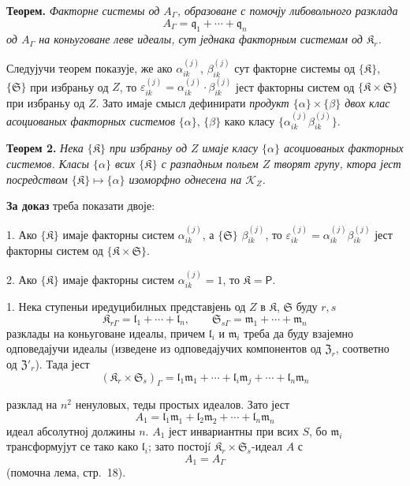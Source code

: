 \documentclass[11pt]{article}
\begin{document}
\textbf{Теорем.} \emph{Факторне системы од \(A_\Gamma\), образоване с помочју либовольного разклада}
\[
A_\Gamma=\mathfrak q_1+\cdots+\mathfrak q_n
\]
\emph{од \(A_\Gamma\) на коньуговане леве идеалы, сут једнака факторным системам од \(\mathfrak K_r\).}

Следујучи теорем показује, же ако \(\alpha_{ik}^{(j)}\), \(\beta_{ik}^{(j)}\) сут факторне системы од \(\{\mathfrak K\}\), \(\{\mathfrak S\}\) при избраньу од \(Z\), то \(\varepsilon_{ik}^{(j)}=\alpha_{ik}^{(j)}\cdot\beta_{ik}^{(j)}\) јест факторны систем од \(\{\mathfrak K\times\mathfrak S\}\) при избраньу од \(Z\). Зато имаје смысл дефинирати \emph{продукт \(\{\alpha\}\times\{\beta\}\) двох клас асоциованых факторных системов} \(\{\alpha\}\), \(\{\beta\}\) како класу \(\{\alpha_{ik}^{(j)}\beta_{ik}^{(j)}\}\).

\textbf{Теорем 2.} \emph{Нека \(\{\mathfrak K\}\) при избраньу од \(Z\) имаје класу \(\{\alpha\}\) асоциованых факторных системов. Класы \(\{\alpha\}\) всих \(\{\mathfrak K\}\) с разпадным польем \(Z\) творят групу, ктора јест посредством \(\{\mathfrak K\}\mapsto\{\alpha\}\) изоморфно однесена на \(\mathscr K_Z\).}

\textbf{За доказ} треба показати двоје:

1. Ако \(\{\mathfrak K\}\) имаје факторны систем \(\alpha_{ik}^{(j)}\), а \(\{\mathfrak S\}\) \(\beta_{ik}^{(j)}\), то \(\varepsilon_{ik}^{(j)}=\alpha_{ik}^{(j)}\beta_{ik}^{(j)}\) јест факторны систем од \(\{\mathfrak K\times\mathfrak S\}\).

2. Ако \(\{\mathfrak K\}\) имаје факторны систем \(\alpha_{ik}^{(j)}=1\), то \(\mathfrak K=\mathsf P\).

1. Нека ступеньи иредуцибилных представјень од \(Z\) в \(\mathfrak K\), \(\mathfrak S\) буду \(r,s\)
\[
\mathfrak K_{r\Gamma}=\mathfrak l_1+\cdots+\mathfrak l_n,\qquad
\mathfrak S_{s\Gamma}=\mathfrak m_1+\cdots+\mathfrak m_n
\]
разклады на коньуговане идеалы, причем \(\mathfrak l_i\) и \(\mathfrak m_i\) треба да буду взајемно одповедајучи идеалы (изведене из одповедајучих компонентов од \(\mathfrak Z_r\), соответно од \(\mathfrak Z'_r\)). Тада јест
\[
(\mathfrak K_r\times\mathfrak S_s)_\Gamma
=\mathfrak l_1\mathfrak m_1+\cdots+\mathfrak l_i\mathfrak m_j+\cdots+\mathfrak l_n\mathfrak m_n
\]

разклад на \(n^2\) ненуловых, теды простых идеалов. Зато јест
\[
A_1=\mathfrak l_1\mathfrak m_1+\mathfrak l_2\mathfrak m_2+\cdots+\mathfrak l_n\mathfrak m_n
\]
идеал абсолутној должины \(n\). \(A_1\) јест инвариантны при всих \(S\), бо \(\mathfrak m_i\) трансформујут се тако како \(\mathfrak l_i\); зато постојí \(\mathfrak K_r\times\mathfrak S_s\)-идеал \(A\) с
\[
A_1=A_\Gamma
\]
(помочна лема, стр.~18).
\end{document}
